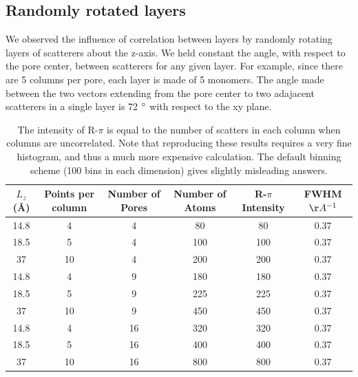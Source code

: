 \documentclass{article}
\begin{document}
  \subsection{Randomly rotated layers}

  We observed the influence of correlation between layers by randomly rotating layers
  of scatterers about the z-axis. We held constant the angle, with respect to the pore
  center, between scatterers for any given layer. For example, since there are 5 
  columns per pore, each layer is made of 5 monomers. The angle made between the two 
  vectors extending from the pore center to two adajacent scatterers in a single layer
  is 72 $\degree$ with respect to the xy plane.  

  \begin{table}[!htb]
  \centering
  \begin{tabular}{c c c c c c}
  \toprule
  $L_z$ (\AA) & Points per column & Number of Pores & Number of Atoms & R-$\pi$ Intensity & FWHM $\AA^{-1}$ \\
  \midrule
  14.8        &      4            & 4               & 80              &  80               & 0.37           \\
  18.5        &      5            & 4               & 100             &  100              & 0.37           \\
  37          &      10           & 4               & 200             &  200              & 0.37           \\
  14.8        &      4            & 9               & 180             &  180              & 0.37           \\
  18.5        &      5            & 9               & 225             &  225              & 0.37           \\
  37          &      10           & 9               & 450             &  450              & 0.37           \\
  14.8        &      4            & 16              & 320             &  320              & 0.37           \\
  18.5        &      5            & 16              & 400             &  400              & 0.37           \\
  37          &      10           & 16              & 800             &  800              & 0.37           \\
  \bottomrule
  \end{tabular}
  \caption{The intensity of R-$\pi$ is equal to the number of scatters in
   each column when columns are uncorrelated. Note that reproducing these results requires a very fine histogram, 
   and thus a much more expensive calculation. The default binning scheme (100 bins in each dimension) gives slightly
   misleading answers.}\label{table:randomly_displaced_columns}
  \end{table}
\end{document}
